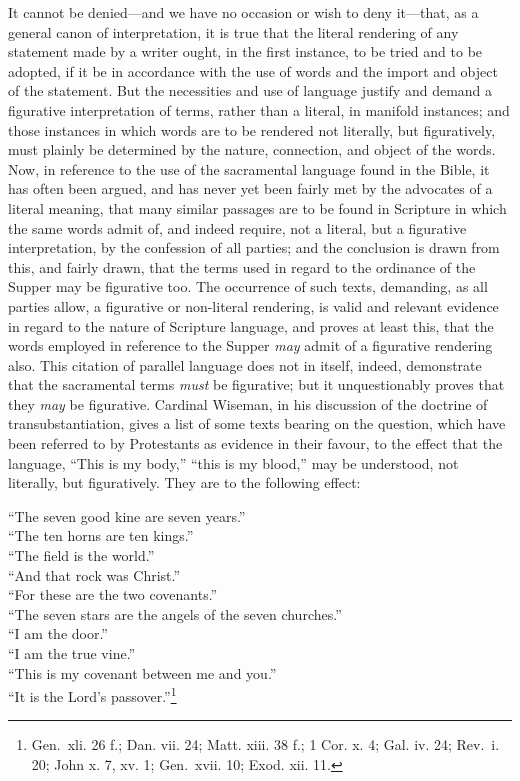 \documentclass[english,]{book}
\begin{document}
It cannot be denied---and we have no occasion or wish to deny it---that, as a general canon of interpretation, it is true that the literal rendering of any statement made by a writer ought, in the first instance, to be tried and to be adopted, if it be in accordance with the use of words and the import and object of the statement. But the necessities and use of language justify and demand a figurative interpretation of terms, rather than a literal, in manifold instances; and those instances in which words are to be rendered not literally, but figuratively, must plainly be determined by the nature, connection, and object of the words. Now, in reference to the use of the sacramental language found in the Bible, it has often been argued, and has never yet been fairly met by the advocates of a literal meaning, that many similar passages are to be found in Scripture in which the same words admit of, and indeed require, not a literal, but a figurative interpretation, by the confession of all parties; and the conclusion is drawn from this, and fairly drawn, that the terms used in regard to the ordinance of the Supper may be figurative too. The occurrence of such texts, demanding, as all parties allow, a figurative or non-literal rendering, is valid and relevant evidence in regard to the nature of Scripture language, and proves at least this, that the words employed in reference to the Supper \emph{may} admit of a figurative rendering also. This citation of parallel language does not in itself, indeed, demonstrate that the sacramental terms \emph{must} be figurative; but it unquestionably proves that they \emph{may} be figurative. Cardinal Wiseman, in his discussion of the doctrine of transubstantiation, gives a list of some texts bearing on the question, which have been referred to by Protestants as evidence in their favour, to the effect that the language, ``This is my body,'' ``this is my blood,'' may be understood, not literally, but figuratively. They are to the following effect:

``The seven good kine are seven years.''\\
``The ten horns are ten kings.''\\
``The field is the world.''\\
``And that rock was Christ.''\\
``For these are the two covenants.''\\
``The seven stars are the angels of the seven churches.''\\
``I am the door.''\\
``I am the true vine.''\\
``This is my covenant between me and you.''\\
``It is the Lord's passover.''\footnote{Gen.~xli. 26 f.; Dan. vii. 24; Matt. xiii. 38 f.; 1 Cor. x. 4; Gal. iv. 24; Rev.~i. 20; John x. 7, xv. 1; Gen.~xvii. 10; Exod. xii. 11.}
\end{document}
